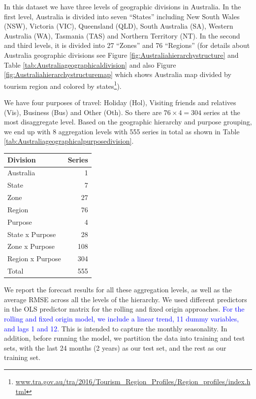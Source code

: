 \documentclass[11pt,a4paper,]{article}
\let\origtable\table
\let\endorigtable\endtable
\renewenvironment{table}[1][2] {
    \expandafter\origtable\expandafter[!htbp]
} {
    \endorigtable
}
\begin{document}
In this dataset we have three levels of geographic divisions in Australia. In the first level, Australia is divided into seven ``States'' including New South Wales (NSW), Victoria (VIC), Queensland (QLD), South Australia (SA), Western Australia (WA), Tasmania (TAS) and Northern Territory (NT). In the second and third levels, it is divided into 27 ``Zones'' and 76 ``Regions'' (for details about Australia geographic divisions see Figure \ref{fig:Australiahierarchystructure} and Table \ref{tab:Australiageographicaldivision} and also Figure \ref{fig:Australiahierarchystructuremap} which shows Australia map divided by tourism region and colored by states\footnote{\url{www.tra.gov.au/tra/2016/Tourism_Region_Profiles/Region_profiles/index.html}}).

We have four purposes of travel: Holiday (Hol), Visiting friends and relatives (Vis), Business (Bus) and Other (Oth). So there are \(76\times4 = 304\) series at the most disaggregate level. Based on the geographic hierarchy and purpose grouping, we end up with 8 aggregation levels with 555 series in total as shown in Table \ref{tab:Australiageographicalpurposedivision}.

\begin{table}[!h]

\caption{\label{tab:Australiageographicalpurposedivision}Number of Australian domestic tourism series at each aggregation level.}
\centering
\begin{tabular}[t]{lr}
\toprule
Division & Series\\
\midrule
Australia & 1\\
State & 7\\
Zone & 27\\
Region & 76\\
Purpose & 4\\
State x Purpose & 28\\
Zone x Purpose & 108\\
Region x Purpose & 304\\
\hline
Total & 555\\
\bottomrule
\end{tabular}
\end{table}

We report the forecast results for all these aggregation levels, as well as the average RMSE across all the levels of the hierarchy. We used different predictors in the OLS predictor
matrix for the rolling and fixed origin approaches. \textcolor{blue}{For the rolling and fixed origin model, we include a linear trend, 11 dummy variables, and lags 1 and 12.} This is intended to capture the monthly seasonality. In addition, before running the model, we partition the data into training and test sets, with the last 24 months (2 years) as our test set, and the rest as our training set.
\end{document}
